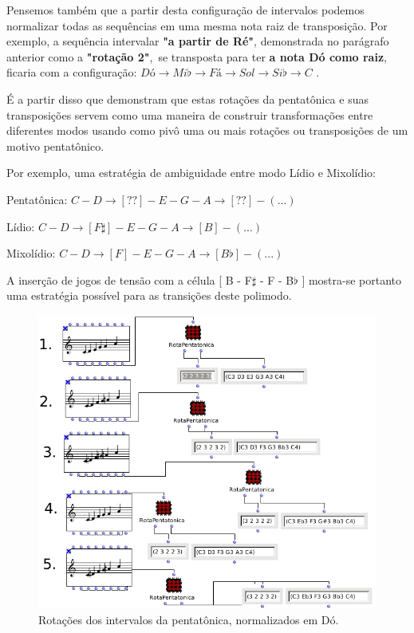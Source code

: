 \documentclass[
	12pt,				%
	openright,			%
	twoside,			%
	a4paper,			%
	english,			%
	french,				%
	spanish,			%
	brazil				%
	]{abntex2}
\begin{document}
Pensemos também que a partir desta configuração de intervalos podemos normalizar todas as sequências em uma mesma nota raiz de transposição. Por exemplo, a sequência intervalar \textbf{"a partir de Ré"}, demonstrada no parágrafo anterior como a \textbf{"rotação 2"},\ se transposta para ter \textbf{a nota Dó como raiz}, ficaria com a configuração: $Dó \rightarrow Mi\flat \rightarrow Fá \rightarrow Sol \rightarrow Si\flat \rightarrow C $ .

É a partir disso que  demonstram que estas rotações da pentatônica e suas transposições servem como uma maneira de construir transformações entre diferentes modos usando como pivô uma ou mais rotações ou transposições de um motivo pentatônico. 


Por exemplo, uma estratégia de ambiguidade entre modo Lídio e Mixolídio:

Pentatônica: $ C - D \rightarrow [ ?? ] - E - G - A \rightarrow [ ?? ] - (...) $ 

Lídio: $ C - D \rightarrow [ F\sharp ] - E - G - A \rightarrow [ B ] - (...) $  

Mixolídio: $ C - D \rightarrow [ F ] - E - G - A \rightarrow [ B\flat ] - (...) $  


A inserção de jogos de tensão com a célula [ B - F$\sharp$ - F - B$\flat$ ] mostra-se portanto uma estratégia possível para as transições deste polimodo.

\begin{figure}[!h]
	\caption{\label{fig_grafico}Rotações dos intervalos da pentatônica, normalizados em Dó. }
	\begin{center}
	    \includegraphics[scale=0.6]{OM_settheory/pentarotacoes.png}
	\end{center}
\end{figure}
\end{document}
